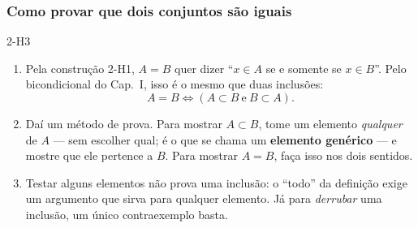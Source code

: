 \subsubsection{Como provar que dois conjuntos são iguais}
\begin{construcao}{2-H3}
\begin{enumerate}[label=(\arabic*)]
  \item Pela construção 2-H1, $A=B$ quer dizer \enquote{$x\in A$ se e somente se $x\in B$}. Pelo bicondicional do Cap.~I, isso é o mesmo que duas inclusões:
\[
A=B\iff (A\subset B\ \text{e}\ B\subset A).
\]
  \item Daí um método de prova. Para mostrar $A\subset B$, tome um elemento \emph{qualquer} de $A$ — sem escolher qual; é o que se chama um \textbf{elemento genérico} — e mostre que ele pertence a $B$. Para mostrar $A=B$, faça isso nos dois sentidos.
  \item Testar alguns elementos não prova uma inclusão: o \enquote{todo} da definição exige um argumento que sirva para qualquer elemento. Já para \emph{derrubar} uma inclusão, um único contraexemplo basta.
\end{enumerate}
\end{construcao}

